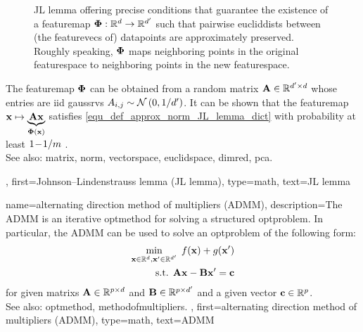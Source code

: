 {{\begin{figure}[H]
		\caption{JL lemma offering precise conditions that guarantee the existence of 
		         a \gls{featuremap} ${\bf \Phi}: \mathbb{R}^{d} \rightarrow \mathbb{R}^{d'}$ 
		         such that pairwise \glspl{eucliddist} between (the \glspl{featurevec} of) \glspl{datapoint} are 
			approximately preserved. Roughly speaking, 
			${\bf \Phi}$ maps neighboring points in the original \gls{featurespace} 
			to neighboring points in the new \gls{featurespace}.}
		\end{figure}
		The \gls{featuremap} ${\bf \Phi}$ can be obtained from a random \gls{matrix} 
		${\bf A} \in \mathbb{R}^{d' \times d}$ whose entries are \gls{iid} 
		\glspl{gaussrv} $A_{i,j} \sim \mathcal{N}\left(0,1/d'\right)$. 
		It can be shown that the \gls{featuremap} ${\bf x} \mapsto \underbrace{{\bf A} {\bf x}}_{{\bf \Phi}({\bf x})}$ 
		satisfies \eqref{equ_def_approx_norm_JL_lemma_dict} with \gls{probability} at least $1\!-\!1/m$ \cite{ProofJLlemma}. 
		\\
  		See also: \gls{matrix}, \gls{norm}, \gls{vectorspace}, \gls{euclidspace}, \gls{dimred}, \gls{pca}.},	
	first={Johnson--Lindenstrauss lemma (JL lemma)},
	type=math, 
  	text={JL lemma}
}

{name={alternating direction method of multipliers (ADMM)},
	description={The 
		ADMM is an iterative \gls{optmethod} for solving a structured \gls{optproblem}. 
		In particular, the ADMM can be used to solve an \gls{optproblem} of the following form:
		\begin{align}
			\min_{\featurevec \in \mathbb{R}^{\nrfeatures},\featurevec' \in \mathbb{R}^{\nrfeatures'}} \; f(\featurevec) 
			+ g(\featurevec') \nonumber \\ 
			\mbox{ s.t. } \mA \featurevec - \mB \featurevec' = \vc \nonumber
		\end{align}
		for given \glspl{matrix} ${\bf A} \in \mathbb{R}^{p \times d}$ and ${\bf B} \in \mathbb{R}^{p \times d'}$
		and a given \gls{vector} ${\bf c} \in \mathbb{R}^p$.
		\\
		See also: \gls{optmethod}, \gls{methodofmultipliers}. }, 
	first={alternating direction method of multipliers (ADMM)},
	type=math,
	text={ADMM}
}	


